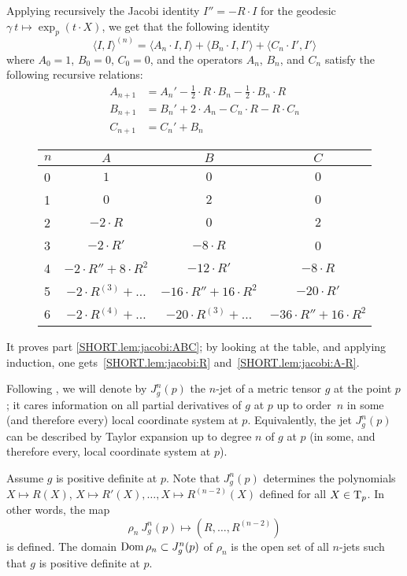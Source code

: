 \documentclass[a4paper,10pt]{article}
\begin{document}
Applying recursively the Jacobi identity $I''=-R\cdot I$ for the geodesic $\gamma\:t\mapsto\exp_p(t\cdot X)$, we get that the following identity 
\[\langle I,I\rangle^{(n)}
=
\langle A_n\cdot  I,I\rangle+ \langle B_n\cdot I,I'\rangle+\langle C_n\cdot I',I'\rangle\]
where $A_0=1$, $B_0=0$, $C_0=0$, and the operators $A_n$, $B_n$, and $C_n$ satisfy the following recursive relations:
\begin{align*}
A_{n+1}&=A_n'-\tfrac12\cdot R\cdot B_n-\tfrac12\cdot B_n\cdot R
\\
B_{n+1}&=B_n'+ 2\cdot A_n-C_n\cdot R-R\cdot C_n
\\
C_{n+1}&=C_n'+ B_n
\end{align*}

\renewcommand{\arraystretch}{1.5}
\begin{figure}[!ht]
\centering
\begin{tabular}{ l|c|c|c }
$n$ & $A$ & $B$ & $C$ \\ \hline
0& $1$   &  $0$  & $0$ \\ \hline
1& $0$   &  $2$  & $0$ \\ \hline 
2& $-2\cdot R$ & $0$ & $2$ \\ \hline 
3& $-2\cdot R'$ & $-8\cdot R$ & 0  \\ \hline 
4& $-2\cdot R''+8\cdot R^2$ & $-12\cdot R'$ & $-8\cdot R$  \\ \hline
5& $-2\cdot R^{(3)}+\dots$ 
& $-16\cdot R''+16\cdot R^2$ & $-20\cdot R'$  \\ \hline
6
&$-2\cdot R^{(4)}+\dots$
&$-20\cdot R^{(3)}+\dots$
&$-36\cdot R''+16\cdot R^2$
\\
\end{tabular}
\end{figure} 

It proves part \ref{SHORT.lem:jacobi:ABC};
by looking at the table, and applying induction, one gets~\ref{SHORT.lem:jacobi:R} and~\ref{SHORT.lem:jacobi:A-R}.\qeds

Following \cite{eliashberg-mishachev}, we will denote by $J^n_g(p)$ the $n$-jet of a metric tensor $g$ at the point $p$;
it cares information on all partial derivatives of $g$ at $p$ up to order~$n$ in some (and therefore every) local coordinate system at $p$.
Equivalently, the jet $J^n_g(p)$ can be described by Taylor expansion up to degree $n$ of $g$ at $p$ (in some, and therefore every, local coordinate system at $p$).

Assume $g$ is positive definite at $p$.
Note that $J^n_g(p)$ determines the polynomials 
$X\mapsto R(X)$, $X\mapsto R'(X),\dots, X\mapsto R^{(n-2)}(X)$ defined for all $X\in \mathrm{T}_p$. 
In other words, the map 
\[\rho_n\:J^n_g(p)\mapsto (R,\dots,R^{(n-2)})\]
is defined.
The domain $\mathop{\rm Dom}\nolimits \rho_n\subset J^n_g(p)$ of $\rho_n$ is the open set of all $n$-jets such that $g$ is positive definite at $p$.
\end{document}
